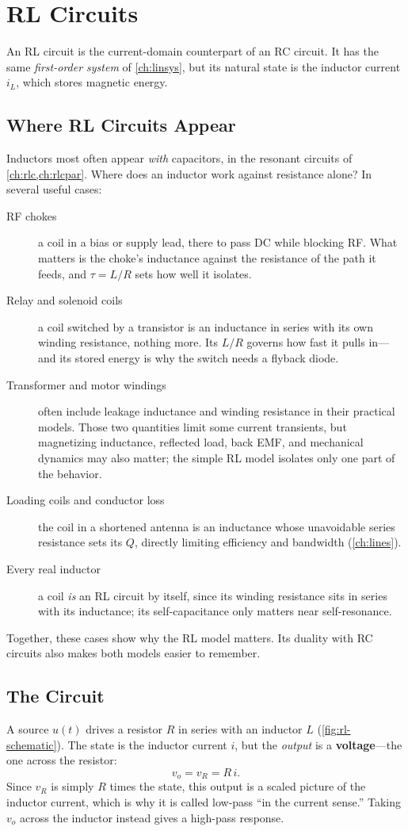 \chapter{RL Circuits}
\label{ch:rl}
An RL circuit is the current-domain counterpart of an RC circuit. It has the same
\emph{first-order system} of \cref{ch:linsys}, but its natural state is the
inductor current \(i_L\), which stores magnetic energy.

\section{Where RL Circuits Appear}
Inductors most often appear \emph{with} capacitors, in the resonant circuits of
\cref{ch:rlc,ch:rlcpar}. Where does an inductor work against resistance alone?
In several useful cases:
\begin{description}
\item[RF chokes] a coil in a bias or supply lead, there to pass DC while blocking
RF. What matters is the choke's inductance against the resistance of the path it
feeds, and \(\tau=L/R\) sets how well it isolates.
\item[Relay and solenoid coils] a coil switched by a transistor is an inductance in
series with its own winding resistance, nothing more. Its \(L/R\) governs how fast
it pulls in---and its stored energy is why the switch needs a flyback diode.
\item[Transformer and motor windings] often include leakage inductance and winding
resistance in their practical models. Those two quantities limit some current
transients, but magnetizing inductance, reflected load, back EMF, and mechanical
dynamics may also matter; the simple RL model isolates only one part of the behavior.
\item[Loading coils and conductor loss] the coil in a shortened antenna is an
inductance whose unavoidable series resistance sets its \(Q\), directly limiting
efficiency and bandwidth (\cref{ch:lines}).
\item[Every real inductor] a coil \emph{is} an RL circuit by itself, since its
winding resistance sits in series with its inductance; its self-capacitance only
matters near self-resonance.
\end{description}
Together, these cases show why the RL model matters. Its duality with RC circuits
also makes both models easier to remember.

\section{The Circuit}
A source \(u(t)\) drives a resistor \(R\) in series with an inductor \(L\)
(\cref{fig:rl-schematic}). The state is the inductor current \(i\), but the
\emph{output} is a \textbf{voltage}---the one across the resistor:
\[
v_o=v_R=R\,i .
\]
Since \(v_R\) is simply \(R\) times the state, this output is a scaled picture of
the inductor current, which is why it is called low-pass ``in the current sense.''
Taking \(v_o\) across the inductor instead gives a high-pass response.

